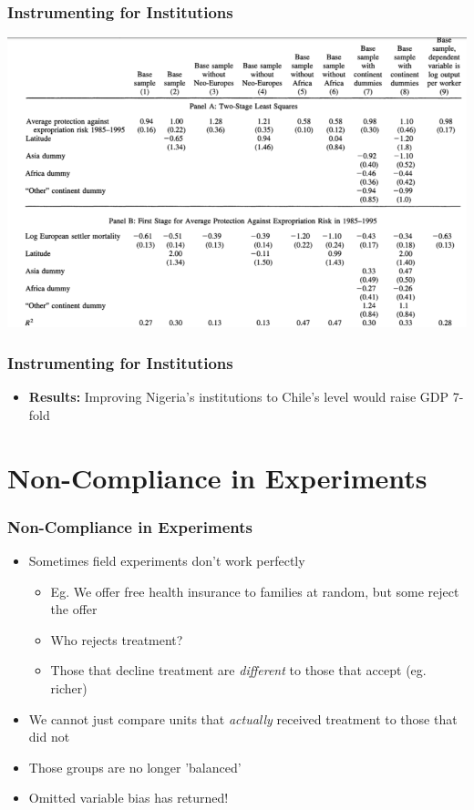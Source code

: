 \documentclass[xcolor=x11names,compress]{beamer}\usepackage[]{graphicx}\usepackage[]{color}
\renewcommand{\(}{\begin{columns}}
\renewcommand{\)}{\end{columns}}
\newcommand{\<}[1]{\begin{column}{#1}}
\renewcommand{\>}{\end{column}}
\begin{document}
\begin{frame}
\frametitle{Instrumenting for Institutions}
\includegraphics[scale=0.36]{AJR_results.png}
\end{frame}

\begin{frame}
\frametitle{Instrumenting for Institutions}
\begin{itemize}
\item \textbf{Results:} Improving Nigeria's institutions to Chile's level would raise GDP 7-fold
\end{itemize}
\end{frame}

\section{Non-Compliance in Experiments}

\begin{frame}
\frametitle{Non-Compliance in Experiments}
\begin{itemize}
\item Sometimes field experiments don't work perfectly
\pause
\begin{itemize}
\item Eg. We offer free health insurance to families at random, but some reject the offer
\pause
\item Who rejects treatment?
\pause
\item Those that decline treatment are \textit{different} to those that accept (eg. richer)
\pause
\end{itemize}
\item We cannot just compare units that \textit{actually} received treatment to those that did not
\pause
\item Those groups are no longer 'balanced'
\pause
\item Omitted variable bias has returned!
\end{itemize}
\end{frame}
\end{document}

